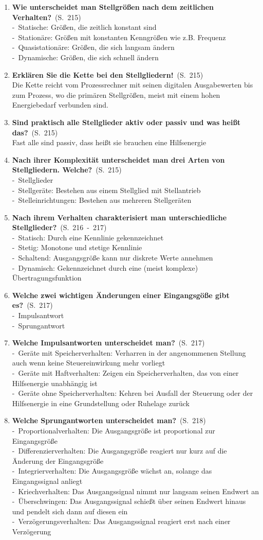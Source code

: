 \documentclass[a4paper,12pt]{article}
\newcommand{\question}[3]{\pagebreak[3]\item {\textbf{#1?}}\ (S.\ #2)#3}
\newcommand{\statement}[3]{\pagebreak[3]\item {\textbf{#1!}}\ (S.\ #2)#3}
\newcommand{\catchword}[1]{\\-\ #1}
\newcommand{\normaltext}[1]{\\#1}
\newcommand{\page}[1]{#1}
\newcommand{\pages}[2]{#1\ -\ #2}
\begin{document}
\begin{enumerate}
  \question{Wie unterscheidet man Stellgrößen nach dem zeitlichen Verhalten}{\page{215}}
  {
    \catchword{Statische: Größen, die zeitlich konstant sind}
    \catchword{Stationäre: Größen mit konstanten Kenngrößen wie z.B. Frequenz}
    \catchword{Quasistationäre: Größen, die sich langsam ändern}
    \catchword{Dynamische: Größen, die sich schnell ändern}
  }

  \statement{Erklären Sie die Kette bei den Stellgliedern}{\page{215}}
  {
    \normaltext{Die Kette reicht vom Prozessrechner mit seinen digitalen Ausgabewerten
                bis zum Prozess, wo die primären Stellgrößen, meist mit einem hohen
                Energiebedarf verbunden sind.}
  }

  \question{Sind praktisch alle Stellglieder aktiv oder passiv und was heißt das}{\page{215}}
  {
    \normaltext{Fast alle sind passiv, dass heißt sie brauchen eine Hilfsenergie}
  }

  \question{Nach ihrer Komplexität unterscheidet man drei Arten von Stellgliedern. Welche}{\page{215}}
  {
    \catchword{Stellglieder}
    \catchword{Stellgeräte: Bestehen aus einem Stellglied mit Stellantrieb}
    \catchword{Stelleinrichtungen: Bestehen aus mehreren Stellgeräten}
  }

  \question{Nach ihrem Verhalten charakterisiert man unterschiedliche Stellglieder}{\pages{216}{217}}
  {
    \catchword{Statisch: Durch eine Kennlinie gekennzeichnet}
    \catchword{Stetig: Monotone und stetige Kennlinie}
    \catchword{Schaltend: Ausgangsgröße kann nur diskrete Werte annehmen}
    \catchword{Dynamisch: Gekennzeichnet durch eine (meist komplexe) Übertragungsfunktion}
  }

  \question{Welche zwei wichtigen Änderungen einer Eingangsgöße gibt es}{\page{217}}
  {
    \catchword{Impulsantwort}
    \catchword{Sprungantwort}
  }

  \question{Welche Impulsantworten unterscheidet man}{\page{217}}
  {
    \catchword{Geräte mit Speicherverhalten: Verharren in der angenommenen Stellung
               auch wenn keine Steuereinwirkung mehr vorliegt}
    \catchword{Geräte mit Haftverhalten: Zeigen ein Speicherverhalten, das von einer
               Hilfsenergie unabhängig ist}
    \catchword{Geräte ohne Speicherverhalten: Kehren bei Ausfall der Steuerung oder der
               Hilfsenergie in eine Grundstellung oder Ruhelage zurück}
  }

  \question{Welche Sprungantworten unterscheidet man}{\page{218}}
  {
    \catchword{Proportionalverhalten: Die Ausgangsgröße ist proportional zur Eingangsgröße}
    \catchword{Differenzierverhalten: Die Ausgangsgröße reagiert nur kurz auf die Änderung
               der Eingangsgröße}
    \catchword{Integrierverhalten: Die Ausgangsgröße wächst an, solange das Eingangssignal
               anliegt}
    \catchword{Kriechverhalten: Das Ausgangssignal nimmt nur langsam seinen Endwert an}
    \catchword{Überschwingen: Das Ausgangssignal schießt über seinen Endwert hinaus und
               pendelt sich dann auf diesen ein}
    \catchword{Verzögerungsverhalten: Das Ausgangssignal reagiert erst nach einer Verzögerung}
  }


\end{enumerate}
\end{document}
